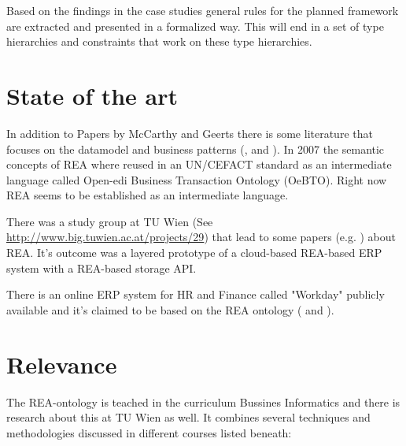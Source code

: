 Based on the findings in the case studies general rules for the planned framework are extracted and presented in a formalized way.
This will end in a set of type hierarchies and constraints that work on these type hierarchies.


\section*{State of the art}

In addition to Papers by McCarthy and Geerts there is some literature that focuses on the datamodel and business patterns (\cite{dunn2005enterpriseinfosys}, \cite{hruby2006modeldrivendesign} and \cite{hollander2000accounting}).
In 2007 the semantic concepts of REA where reused in an UN/CEFACT standard \cite{ISOIEC1594442007} as an intermediate language called Open-edi Business Transaction Ontology (OeBTO).
Right now REA seems to be established as an intermediate language.  

There was a study group at TU Wien (See \url{http://www.big.tuwien.ac.at/projects/29}) that lead to some papers (e.g. \cite{wally2015modeldriven}) about REA.
It's outcome was a layered prototype of a cloud-based REA-based ERP system with a REA-based storage API.

There is an online ERP system for HR and Finance called "Workday" publicly available and it's claimed to be based on the REA ontology (\cite{nittler2012modernizeaccounting} and \cite{howlett2007workdayfinancials}).


\section*{Relevance}

The REA-ontology is teached in the curriculum Bussines Informatics and there is research about this at TU Wien as well.
It combines several techniques and methodologies discussed in different courses listed beneath:

